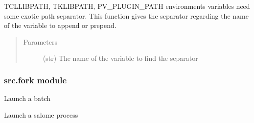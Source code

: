 \documentclass[a4paper,10pt,english]{sphinxmanual}
\begin{document}

\begin{fulllineitems}
\label{\detokenize{apidoc_src/src:src.fileEnviron.special_path_separator}}
TCLLIBPATH, TKLIBPATH, PV\_PLUGIN\_PATH environments variables 
need some exotic path separator.
This function gives the separator regarding the name of the variable
to append or prepend.
\begin{quote}\begin{description}
\item[{Parameters}] \leavevmode
{} \textendash{} (str) The name of the variable to find the separator

\end{description}\end{quote}

\end{fulllineitems}



\subsubsection{src.fork module}
\label{\detokenize{apidoc_src/src:module-src.fork}}\label{\detokenize{apidoc_src/src:src-fork-module}}

\begin{fulllineitems}
\label{\detokenize{apidoc_src/src:src.fork.batch}}
Launch a batch

\end{fulllineitems}


\begin{fulllineitems}
\label{\detokenize{apidoc_src/src:src.fork.batch_salome}}
Launch a salome process

\end{fulllineitems}
\end{document}
